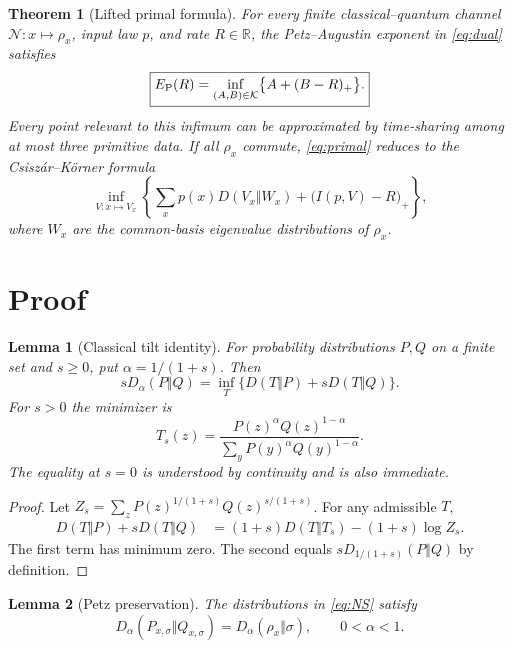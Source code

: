 \documentclass[10pt]{article}
\newtheorem{theorem}{Theorem}
\newtheorem{lemma}{Lemma}
\newcommand{\cK}{\mathcal K}
\newcommand{\cN}{\mathcal N}
\begin{document}
\begin{theorem}[Lifted primal formula]\label{thm:main}
For every finite classical--quantum channel $\cN:x\mapsto\rho_x$, input law
$p$, and rate $R\in\mathbb R$, the Petz--Augustin exponent in
\eqref{eq:dual} satisfies
\begin{equation}\label{eq:primal}
 \boxed{
 E_{\rm P}(R)
 =\inf_{(A,B)\in\cK}\bigl\{A+(B-R)_+\bigr\}.}
\end{equation}
Every point relevant to this infimum can be approximated by time-sharing among
at most three primitive data. If all $\rho_x$ commute, \eqref{eq:primal}
reduces to the Csisz\'ar--K\"orner formula
\begin{equation}\label{eq:CK}
 \inf_{V:x\mapsto V_x}
 \left\{
 \sum_xp(x)D(V_x\Vert W_x)
 +\bigl(I(p,V)-R\bigr)_+
 \right\},
\end{equation}
where $W_x$ are the common-basis eigenvalue distributions of $\rho_x$.
\end{theorem}

\section{\hspace{0.22em}Proof}

\begin{lemma}[Classical tilt identity]\label{lem:tilt}
For probability distributions $P,Q$ on a finite set and $s\ge0$, put
$\alpha=1/(1+s)$. Then
\begin{equation}\label{eq:tilt}
 sD_\alpha(P\Vert Q)
 =\inf_T\bigl\{D(T\Vert P)+sD(T\Vert Q)\bigr\}.
\end{equation}
For $s>0$ the minimizer is
\[
 T_s(z)=\frac{P(z)^\alpha Q(z)^{1-\alpha}}
 {\sum_yP(y)^\alpha Q(y)^{1-\alpha}}.
\]
The equality at $s=0$ is understood by continuity and is also immediate.
\end{lemma}

\begin{proof}
Let $Z_s=\sum_zP(z)^{1/(1+s)}Q(z)^{s/(1+s)}$. For any admissible $T$,
\begin{align*}
 D(T\Vert P)+sD(T\Vert Q)
 &=(1+s)D(T\Vert T_s)-(1+s)\log Z_s.
\end{align*}
The first term has minimum zero. The second equals
$sD_{1/(1+s)}(P\Vert Q)$ by definition.
\end{proof}

\begin{lemma}[Petz preservation]\label{lem:NS}
The distributions in \eqref{eq:NS} satisfy
\[
 D_\alpha(P_{x,\sigma}\Vert Q_{x,\sigma})
 =D_\alpha(\rho_x\Vert\sigma),\qquad 0<\alpha<1.
\]
\end{lemma}
\end{document}
